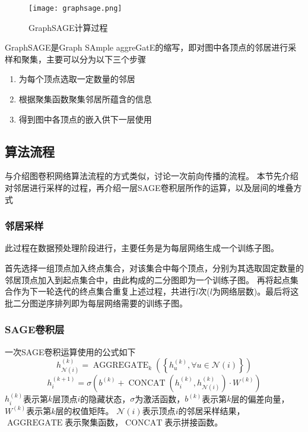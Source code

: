 \begin{figure}[htb]
    \centering
    \texttt{[image: graphsage.png]}
    \caption{GraphSAGE计算过程}
\end{figure}

GraphSAGE是Graph SAmple aggreGatE的缩写，即对图中各顶点的邻居进行采样和聚集，主要可以分为以下三个步骤
\begin{enumerate}
    \item 为每个顶点选取一定数量的邻居
    \item 根据聚集函数聚集邻居所蕴含的信息
    \item 得到图中各顶点的嵌入供下一层使用
\end{enumerate}

\subsection{算法流程}
与介绍图卷积网络算法流程的方式类似，讨论一次前向传播的流程。
本节先介绍对邻居进行采样的过程，再介绍一层SAGE卷积层所作的运算，以及层间的堆叠方式

\subsubsection{邻居采样}
此过程在数据预处理阶段进行，主要任务是为每层网络生成一个训练子图。

首先选择一组顶点加入终点集合，对该集合中每个顶点，分别为其选取固定数量的邻居顶点加入到起点集合中，由此构成的二分图即为一个训练子图。
再将起点集合作为下一轮迭代的终点集合重复上述过程，共进行$l$次($l$为网络层数)。最后将这批二分图逆序排列即为每层网络需要的训练子图。

\subsubsection{SAGE卷积层}
\begin{definition}
    一次SAGE卷积运算使用的公式如下
    \begin{equation}
        {h}_{\mathcal{N}(i)}^{(k)} = \operatorname{AGGREGATE}_{k}\left(\left\{{h}_{u}^{(k)}, \forall u \in \mathcal{N}(i)\right\}\right)
    \end{equation}
    \begin{equation}
        {h}_{i}^{(k+1)} = \sigma\left(b^{(k)} + \operatorname{CONCAT}\left({h}_{i}^{(k)}, {h}_{\mathcal{N}(i)}^{(k)}\right) \cdot {W}^{(k)}\right)
    \end{equation}
    $h^{(k)}_i$表示第$k$层顶点$i$的隐藏状态，$\sigma$为激活函数，$b^{(k)}$表示第$k$层的偏差向量，$W^{(k)}$表示第$k$层的权值矩阵。
    $\mathcal{N}(i)$表示顶点$i$的邻居采样结果，$\operatorname{AGGREGATE}$表示聚集函数，$\operatorname{CONCAT}$表示拼接函数。
\end{definition}

